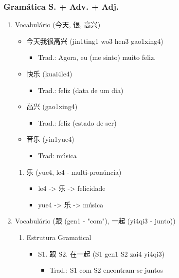 \documentclass[11pt]{article}
\begin{document}
\subsubsection{Gramática S. + Adv. + Adj.}
\label{sec:orga0101c2}
\begin{enumerate}
\item Vocabulário (今天, 很, 高兴)
\label{sec:orgcbfbae4}
\begin{itemize}
\item 今天我很高兴 (jin1ting1 wo3 hen3 gao1xing4)
\begin{itemize}
\item Trad.: Agora, eu (me sinto) muito feliz.
\end{itemize}

\item 快乐 (kuai4le4)
\begin{itemize}
\item Trad.: feliz (data de um dia)
\end{itemize}

\item 高兴 (gao1xing4)
\begin{itemize}
\item Trad.: feliz (estado de ser)
\end{itemize}

\item 音乐 (yin1yue4)
\begin{itemize}
\item Trad: música
\end{itemize}
\end{itemize}

\begin{enumerate}
\item 乐 (yue4, le4 - multi-pronúncia)
\label{sec:org2fa3de5}
\begin{itemize}
\item le4 -> 乐 -> felicidade
\item yue4 -> 乐 -> música
\end{itemize}
\end{enumerate}

\item Vocabulário (跟 (gen1 - "com"), 一起 (yi4qi3 - junto))
\label{sec:org5d68236}
\begin{enumerate}
\item Estrutura Gramatical
\label{sec:org217c661}
\begin{itemize}
\item S1. 跟 S2. 在一起 (S1 gen1 S2 zai4 yi4qi3)

\begin{itemize}
\item Trad.: S1 com S2 encontram-se juntos
\end{itemize}
\end{itemize}
\end{enumerate}
\end{enumerate}
\end{document}
